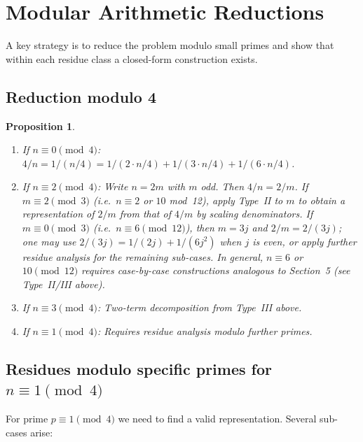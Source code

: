 \documentclass[12pt,a4paper]{amsart}
\newtheorem{proposition}[theorem]{Proposition}
\theoremstyle{definition}
\begin{document}
\section{Modular Arithmetic Reductions}

A key strategy is to reduce the problem modulo small primes and show that
within each residue class a closed-form construction exists.

\subsection{Reduction modulo 4}

\begin{proposition}\label{prop:mod4}
\begin{enumerate}[label=(\roman*)]
\item If $n \equiv 0 \pmod 4$: $4/n = 1/(n/4) = 1/(2\cdot n/4) + 1/(3\cdot n/4) + 1/(6\cdot n/4)$.
\item If $n \equiv 2 \pmod 4$: Write $n = 2m$ with $m$ odd.
      Then $4/n = 2/m$.  If $m \equiv 2 \pmod 3$ (i.e.\ $n \equiv 2$ or $10$
      mod~12), apply Type~II to $m$ to obtain a representation of $2/m$ from
      that of $4/m$ by scaling denominators.  If $m \equiv 0 \pmod 3$
      (i.e.\ $n \equiv 6 \pmod{12}$), then $m = 3j$ and $2/m = 2/(3j)$;
      one may use $2/(3j) = 1/(2j) + 1/(6j^2)$ when $j$ is even, or
      apply further residue analysis for the remaining sub-cases.
      In general, $n \equiv 6$ or $10 \pmod{12}$ requires case-by-case
      constructions analogous to Section~5 (see Type~II/III above).
\item If $n \equiv 3 \pmod 4$: Two-term decomposition from Type~III above.
\item If $n \equiv 1 \pmod 4$: Requires residue analysis modulo further primes.
\end{enumerate}
\end{proposition}

\subsection{Residues modulo specific primes for $n \equiv 1 \pmod 4$}

For prime $p \equiv 1 \pmod 4$ we need to find a valid representation.
Several sub-cases arise:
\end{document}
